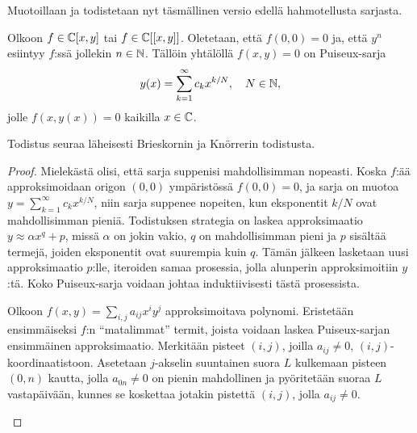 Muotoillaan ja todistetaan nyt täsmällinen versio edellä hahmotellusta sarjasta.
\begin{lause}
    \label{lause:puiseux-sarja}
    Olkoon $f\in\mathbb{C}[x,y]$ tai $f\in\mathbb{C}[[x,y]]$. Oletetaan, että $f(0,0)=0$ ja, että $y^n$ esiintyy $f$:ssä jollekin $n\in\mathbb{N}$. Tällöin yhtälöllä $f(x,y)=0$ on Puiseux-sarja
    \begin{equation*}
        y(x)=\sum_{k=1}^{\infty}c_kx^{k/N},\quad N\in\mathbb{N},
    \end{equation*}
    jolle $f(x,y(x))=0$ kaikilla $x\in\mathbb{C}$.
\end{lause}
Todistus seuraa läheisesti Brieskornin ja Knörrerin todistusta.
\begin{proof}
    Mielekästä olisi, että sarja suppenisi mahdollisimman nopeasti. Koska $f$:ää approksimoidaan origon $(0,0)$ ympäristössä $f(0,0)=0$, ja sarja on muotoa $y=\sum_{k=1}^{\infty}c_kx^{k/N}$, niin sarja suppenee nopeiten, kun eksponentit $k/N$ ovat mahdollisimman pieniä. Todistuksen strategia on laskea approksimaatio $y\approx\alpha x^q+p$, missä $\alpha$ on jokin vakio, $q$ on mahdollisimman pieni ja $p$ sisältää termejä, joiden eksponentit ovat suurempia kuin $q$. Tämän jälkeen lasketaan uusi approksimaatio $p$:lle, iteroiden samaa prosessia, jolla alunperin approksimoitiin $y$:tä. Koko Puiseux-sarja voidaan johtaa induktiivisesti tästä prosessista.

    Olkoon $f(x,y)=\sum_{i,j}a_{ij}x^iy^j$ approksimoitava polynomi. Eristetään ensimmäiseksi $f$:n ``matalimmat'' termit, joista voidaan laskea Puiseux-sarjan ensimmäinen approksimaatio. Merkitään pisteet $(i,j)$, joilla $a_{ij}\ne0$, $(i,j)$-koordinaatistoon. Asetetaan $j$-akselin suuntainen suora $L$ kulkemaan pisteen $(0,n)$ kautta, jolla $a_{0n}\ne0$ on pienin mahdollinen ja pyöritetään suoraa $L$ vastapäivään, kunnes se koskettaa jotakin pistettä $(i,j)$, jolla $a_{ij}\ne0$.
    \begin{center}
\end{center}
\end{proof}
